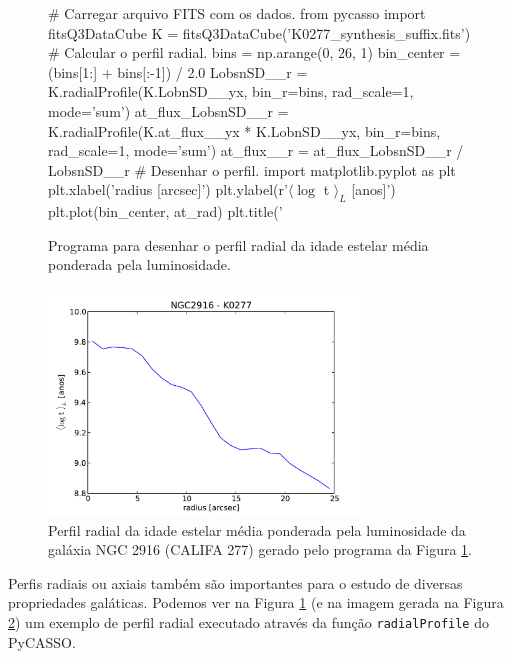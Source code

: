 \begin{figure}
	\begin{python}
# Carregar arquivo FITS com os dados.
from pycasso import fitsQ3DataCube
K = fitsQ3DataCube('K0277_synthesis_suffix.fits')
# Calcular o perfil radial.
bins = np.arange(0, 26, 1)
bin_center = (bins[1:] + bins[:-1]) / 2.0
LobsnSD__r = K.radialProfile(K.LobnSD__yx, bin_r=bins,
							 rad_scale=1, mode='sum')
at_flux_LobsnSD__r = K.radialProfile(K.at_flux__yx * K.LobnSD__yx,
									 bin_r=bins, rad_scale=1,
									 mode='sum')
at_flux__r = at_flux_LobsnSD__r / LobsnSD__r
# Desenhar o perfil.
import matplotlib.pyplot as plt
plt.xlabel('radius [arcsec]')
plt.ylabel(r'$\langle \log$ t $\rangle_L$ [anos]')
plt.plot(bin_center, at_rad)
plt.title('%
	\end{python}
	\caption[Exemplo de programa para perfil radial.]
	{Programa para desenhar o perfil radial da idade estelar média ponderada pela
	luminosidade.}
	\label{fig:programaPerfRad}
\end{figure}

\begin{figure}
	\includegraphics[width=0.75\textwidth]{figuras/K0277-at_flux_radprof.pdf}
	\caption[Perfil radial da idade estelar média da galáxia NGC 2916 (CALIFA 277).]
	{Perfil radial da idade estelar média ponderada pela luminosidade da galáxia
	NGC 2916 (CALIFA 277) gerado pelo programa da Figura \ref{fig:programaPerfRad}.}
	\label{fig:perfRad}
\end{figure}

Perfis radiais ou axiais também são importantes para o estudo de diversas propriedades galáticas. Podemos ver na Figura \ref{fig:programaPerfRad} (e na imagem gerada na Figura \ref{fig:perfRad}) um exemplo de perfil radial executado através da função \texttt{radialProfile} do PyCASSO.


